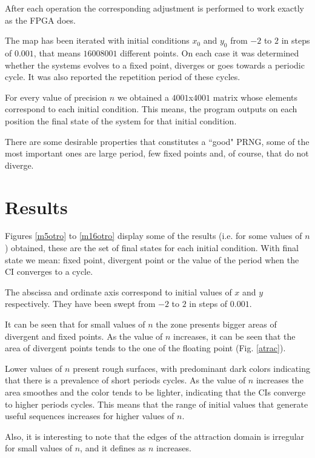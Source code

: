 \documentclass[conference]{IEEEtran}
\begin{document}
After each operation the corresponding adjustment is performed to work exactly as the FPGA does.


The map has been iterated with initial conditions $x_0$ and $y_0$
from  $-2$ to $2$ in steps of $0.001$, that means $16008001$
different points. On each case it was determined whether the
systems evolves to a fixed point, diverges or goes towards a
periodic cycle. It was also reported the repetition period of
these cycles.


For every value of precision $n$ we obtained a $4001$x$4001$ matrix whose elements correspond to each
initial condition. This means, the program outputs on each
position the final state of the system for that initial condition.

There are some desirable properties that constitutes a ``good"
PRNG, some of the most important ones are large period, few fixed
points and, of course, that do not diverge.

\section{Results} \label{sec:resultads}

Figures \ref{m5otro} to \ref{m16otro} display some of the results
(i.e. for some values of $n$) obtained, these are the set of final
states for each initial condition. With final state we mean: fixed
point, divergent point or the value of the period when the CI
converges to a cycle.

The abscissa and ordinate axis correspond to initial values of $x$
and $y$ respectively. They have been swept from $-2$ to $2$ in
steps of $0.001$.

It can be seen that for small values of $n$ the zone presents
bigger areas of divergent and fixed points. As the value of $n$
increases, it can be seen that the area of divergent points tends
to the one of the floating point (Fig. \ref{atrac}).

Lower values of $n$ present rough surfaces, with predominant dark
colors indicating that there is a prevalence of
 short periods cycles. As the value of $n$ increases the area smoothes and the
color tends to be lighter, indicating that the CIs converge to
higher periods cycles. This means that the range of initial values
that generate useful sequences increases for higher values of $n$.

Also, it is interesting to note that the edges of the attraction
domain is irregular for small values of $n$, and it defines as $n$
increases.
\end{document}
